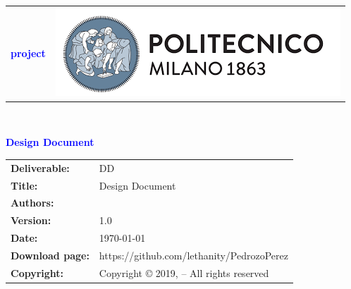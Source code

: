




\begin{titlepage}



{\begin{table}[t!]
\centering
\begin{tabu} to \textwidth { X[1.3,r,p] X[1.7,l,p] }
\textcolor{Blue}
{\textbf{\small{\projectName{} project \newline \names{}}}} & \includegraphics[scale=0.5]{Images/PolimiLogo}
\end{tabu}
\end{table}}~\\ [7cm]


\begin{flushleft}

{\textcolor{Blue}{\textbf{\Huge{Design
        Document}}}} \\ [1cm]

\end{flushleft}

\end{titlepage}

\begin{table}[h!]
\begin{tabu} to \textwidth { X[0.3,r,p] X[0.7,l,p] }
\hline

\textbf{Deliverable:} & DD\\
\textbf{Title:} & Design Document \\
\textbf{Authors:} & \names{} \\
\textbf{Version:} & 1.0 \\ 
\textbf{Date:} & \today \\
\textbf{Download page:} & https://github.com/lethanity/PedrozoPerez \\
\textbf{Copyright:} & Copyright © 2019, \names{}  – All rights reserved \\
\hline
\end{tabu}
\end{table}




